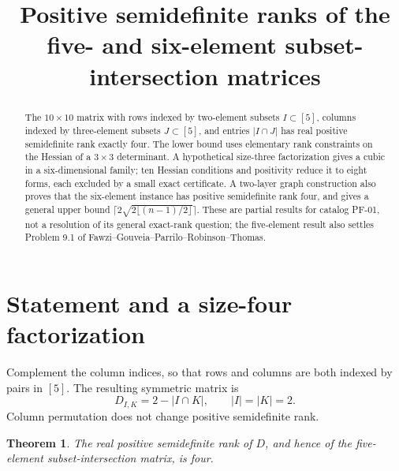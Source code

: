 \documentclass[11pt]{article}
\title{Positive semidefinite ranks of the five- and six-element subset-intersection matrices}
\author{}\date{}
\newtheorem{theorem}{Theorem}
\begin{document}
\maketitle
\begin{abstract}
The $10\times10$ matrix with rows indexed by two-element subsets $I\subset[5]$, columns indexed by three-element subsets $J\subset[5]$, and entries $|I\cap J|$ has real positive semidefinite rank exactly four. The lower bound uses elementary rank constraints on the Hessian of a $3\times3$ determinant. A hypothetical size-three factorization gives a cubic in a six-dimensional family; ten Hessian conditions and positivity reduce it to eight forms, each excluded by a small exact certificate. A two-layer graph construction also proves that the six-element instance has positive semidefinite rank four, and gives a general upper bound $\lceil2\sqrt{2\lfloor(n-1)/2\rfloor}\rceil$. These are partial results for catalog PF-01, not a resolution of its general exact-rank question; the five-element result also settles Problem 9.1 of Fawzi--Gouveia--Parrilo--Robinson--Thomas.
\end{abstract}

\section{Statement and a size-four factorization}
Complement the column indices, so that rows and columns are both indexed by pairs in $[5]$. The resulting symmetric matrix is
\[
 D_{I,K}=2-|I\cap K|,\qquad |I|=|K|=2.
\]
Column permutation does not change positive semidefinite rank.

\begin{theorem}\label{thm:main}
The real positive semidefinite rank of $D$, and hence of the five-element subset-intersection matrix, is four.
\end{theorem}
\end{document}
